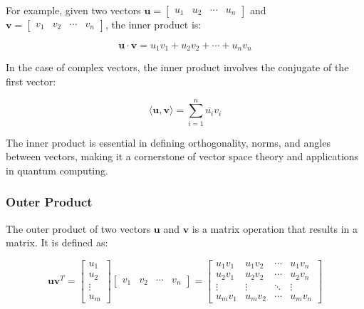 \documentclass{article}
\begin{document}
For example, given two vectors \( \mathbf{u} = \begin{bmatrix} u_1 & u_2 & \cdots & u_n \end{bmatrix} \) and \( \mathbf{v} = \begin{bmatrix} v_1 & v_2 & \cdots & v_n \end{bmatrix} \), the inner product is:

\begin{equation}
    \mathbf{u} \cdot \mathbf{v} = u_1 v_1 + u_2 v_2 + \cdots + u_n v_n
\end{equation}

In the case of complex vectors, the inner product involves the conjugate of the first vector:

\begin{equation}
    \langle \mathbf{u}, \mathbf{v} \rangle = \sum_{i=1}^{n} \overline{u_i} v_i
\end{equation}

The inner product is essential in defining orthogonality, norms, and angles between vectors, making it a cornerstone of vector space theory and applications in quantum computing.

\subsubsection{Outer Product}

The outer product of two vectors \( \mathbf{u} \) and \( \mathbf{v} \) is a matrix operation that results in a matrix.  It is defined as: 

\begin{equation}
    \mathbf{u} \mathbf{v}^T = \begin{bmatrix}
        u_1 \\
        u_2 \\
        \vdots \\
        u_m
    \end{bmatrix}
    \begin{bmatrix}
        v_1 & v_2 & \cdots & v_n
    \end{bmatrix}
    = \begin{bmatrix}
        u_1 v_1 & u_1 v_2 & \cdots & u_1 v_n \\
        u_2 v_1 & u_2 v_2 & \cdots & u_2 v_n \\
        \vdots & \vdots & \ddots & \vdots \\
        u_m v_1 & u_m v_2 & \cdots & u_m v_n
    \end{bmatrix}
\end{equation}
\end{document}

